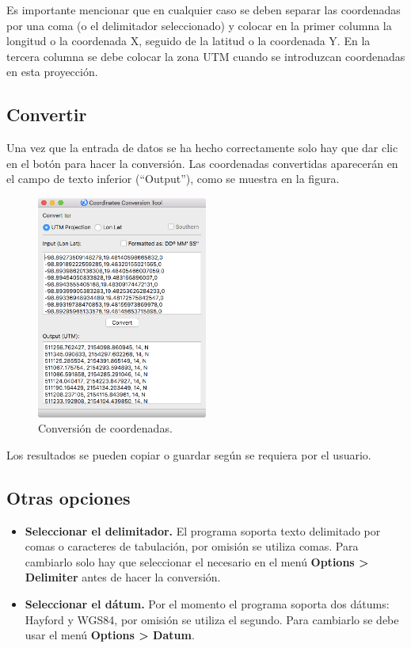 \documentclass[12pt, letterpaper]{article}
\begin{document}
Es importante mencionar que en cualquier caso se deben separar las coordenadas por una coma (o el delimitador seleccionado) y colocar en la primer columna la longitud o la coordenada X, seguido de la latitud o la coordenada Y. En la tercera columna se debe colocar la zona UTM cuando se introduzcan coordenadas en esta proyección.

\subsection{Convertir}

Una vez que la entrada de datos se ha hecho correctamente solo hay que dar clic en el botón para hacer la conversión. Las coordenadas convertidas aparecerán en el campo de texto inferior (``Output''), como se muestra en la figura.

\begin{figure}[h]
    \centering
    \includegraphics[width=0.5\textwidth]{img/conversion.png}
    \caption{Conversión de coordenadas.}
    \label{fig:conversion}
\end{figure}

Los resultados se pueden copiar o guardar según se requiera por el usuario.

\subsection{Otras opciones}

\begin{itemize}
\item \textbf{Seleccionar el delimitador.} El programa soporta texto delimitado por comas o caracteres de tabulación, por omisión se utiliza comas. Para cambiarlo solo hay que seleccionar el necesario en el menú \textbf{Options > Delimiter} antes de hacer la conversión.
\item \textbf{Seleccionar el dátum.} Por el momento el programa soporta dos dátums: Hayford y WGS84, por omisión se utiliza el segundo. Para cambiarlo se debe usar el menú \textbf{Options > Datum}.

\end{itemize}
\end{document}
